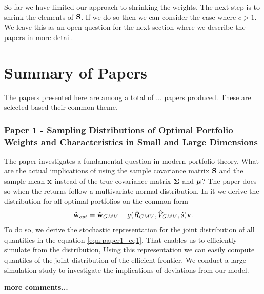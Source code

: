\documentclass[]{book}\usepackage{knitr}
\begin{document}
So far we have limited our approach to shrinking the weights. 
The next step is to shrink the elements of $\mathbf{S}$.
If we do so then we can consider the case where $c>1$.
We leave this as an open question for the next section where we describe the papers in more detail.

\chapter{Summary of Papers}\label{ch:papersummary}


The papers presented here are among a total of ... papers produced. These are selected based their common theme.

\subsection*{Paper 1 - Sampling Distributions of Optimal Portfolio Weights and Characteristics in Small and Large Dimensions}\label{sec:paper1}
The paper investigates a fundamental question in modern portfolio theory. 
What are the actual implications of using the sample covariance matrix $\mathbf{S}$ and the sample mean $\bar{\mathbf{x}}$ instead of the true covariance matrix $\mathbf{\Sigma}$ and $\mbox{\boldmath$\mu$}$?
The paper does so when the returns follow a multivariate normal distribution. 
In it we derive the distribution for all optimal portfolios on the common form
\begin{equation}\label{eqn:paper1_eq1}
  \mathbf{\hat{w}}_{opt} = \mathbf{\hat{w}}_{GMV} + g(\hat{R}_{GMV}, \hat{V}_{GMV}, \hat{s})\mathbf{v}.
\end{equation}
To do so, we derive the stochastic representation for the joint distribution of all quantities in the equation \eqref{eqn:paper1_eq1}. 
That enables us to efficiently simulate from the distribution, 
Using this representation we can easily compute quantiles of the joint distribution of the efficient frontier.
We conduct a large simulation study to investigate the implications of deviations from our model.

\textbf{more comments...}
\end{document}
